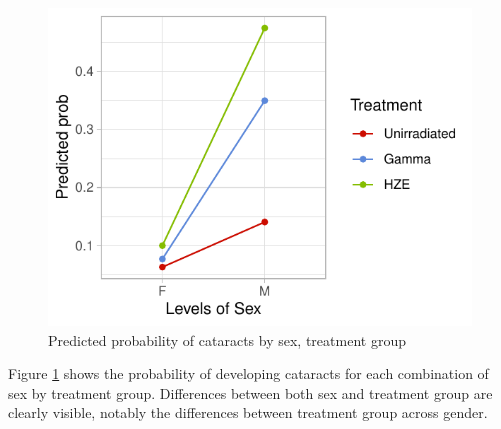 \documentclass[12pt]{article}
\begin{document}
\begin{figure}[H]

\includegraphics{bookdown_report_files/figure-latex/contr-1} \hfill{}

\caption{Predicted probability of cataracts by sex, treatment group}\label{fig:contr}
\end{figure}

Figure \ref{fig:contr} shows the probability of developing cataracts for each combination of sex by treatment group. Differences between both sex and treatment group are clearly visible, notably the differences between treatment group across gender.
\end{document}

